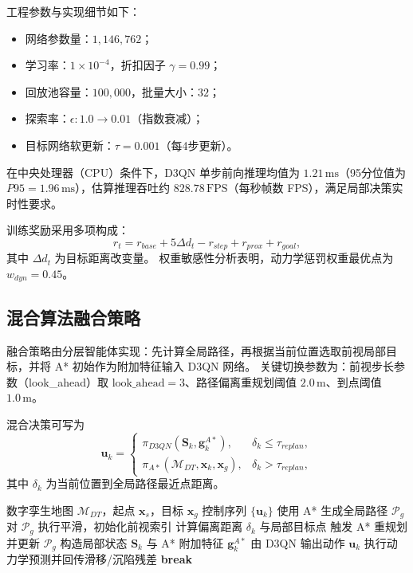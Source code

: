 \documentclass[UTF8,zihao=-4,a4paper,oneside,openany]{ctexrep}
\numberwithin{equation}{chapter}
\theoremstyle{plain}
\theoremstyle{definition}
\newenvironment{myitemize}{\begin{itemize}[noitemsep,topsep=0pt]}{\end{itemize}}
\begin{document}
工程参数与实现细节如下：
\begin{myitemize}
	\item 网络参数量：$1{,}146{,}762$；
	\item 学习率：$1\times10^{-4}$，折扣因子 $\gamma=0.99$；
	\item 回放池容量：$100{,}000$，批量大小：$32$；
	\item 探索率：$\epsilon:1.0\rightarrow0.01$（指数衰减）；
	\item 目标网络软更新：$\tau=0.001$（每4步更新）。
\end{myitemize}

在中央处理器（CPU）条件下，D3QN 单步前向推理均值为 $1.21\,\mathrm{ms}$（95分位值为 $P95=1.96\,\mathrm{ms}$），估算推理吞吐约 $828.78\,\mathrm{FPS}$（每秒帧数 FPS），满足局部决策实时性要求。

训练奖励采用多项构成：
\begin{equation}
r_t=r_{base}+5\Delta d_t-r_{step}+r_{prox}+r_{goal},
\label{eq:ch6_reward}
\end{equation}
其中 $\Delta d_t$ 为目标距离改变量。
权重敏感性分析表明，动力学惩罚权重最优点为 $w_{dyn}=0.45$。

\subsection{混合算法融合策略}
\label{subsec:ch6_fusion}

融合策略由分层智能体实现：先计算全局路径，再根据当前位置选取前视局部目标，并将 A* 初始作为附加特征输入 D3QN 网络。
关键切换参数为：前视步长参数（look\_ahead）取 $\mathrm{look\_ahead}=3$、路径偏离重规划阈值 $2.0\,\mathrm{m}$、到点阈值 $1.0\,\mathrm{m}$。

混合决策可写为
\begin{equation}
\mathbf{u}_k=
\begin{cases}
\pi_{D3QN}\!\left(\mathbf{S}_k,\mathbf{g}^{A*}_k\right), & \delta_k\le \tau_{replan},\\
\pi_{A*}\!\left(\mathcal{M}_{DT},\mathbf{x}_k,\mathbf{x}_g\right), & \delta_k> \tau_{replan},
\end{cases}
\label{eq:ch6_switch}
\end{equation}
其中 $\delta_k$ 为当前位置到全局路径最近点距离。

\begin{algorithm}[H]
\caption{A*-D3QN 混合路径规划（A-D3QN）}
\label{alg:ch6_ad3qn}
\begin{algorithmic}[1]
\REQUIRE 数字孪生地图 $\mathcal{M}_{DT}$，起点 $\mathbf{x}_s$，目标 $\mathbf{x}_g$
\ENSURE 控制序列 $\{\mathbf{u}_k\}$
\STATE 使用 A* 生成全局路径 $\mathcal{P}_g$
\STATE 对 $\mathcal{P}_g$ 执行平滑，初始化前视索引
\STATE 计算偏离距离 $\delta_k$ 与局部目标点
\STATE 触发 A* 重规划并更新 $\mathcal{P}_g$
\ENDIF
\STATE 构造局部状态 $\mathbf{S}_k$ 与 A* 附加特征 $\mathbf{g}^{A*}_k$
\STATE 由 D3QN 输出动作 $\mathbf{u}_k$
\STATE 执行动力学预测并回传滑移/沉陷残差
\STATE \textbf{break}
\ENDIF
\ENDFOR
\end{algorithmic}
\end{algorithm}
\end{document}
